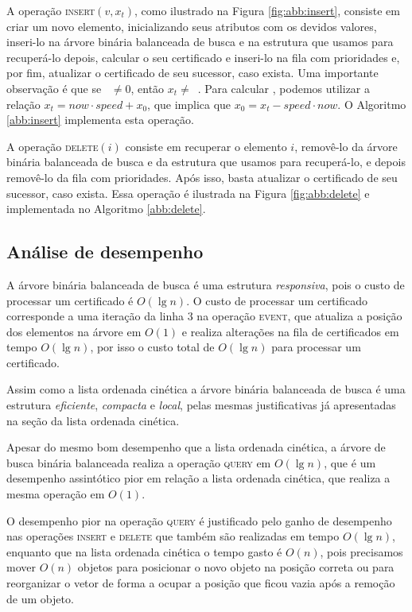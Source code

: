 A operação \textsc{insert}$(v, x_t)$, como ilustrado na Figura
\ref{fig:abb:insert}, consiste em criar um novo elemento,
inicializando seus atributos com os devidos valores, inseri-lo na
árvore binária balanceada de busca e na estrutura que usamos para
recuperá-lo depois, calcular o seu certificado e inseri-lo na fila
com prioridades e, por fim, atualizar o certificado de seu sucessor,
caso exista. Uma importante observação é que se \now~$\neq 0$, então
$x_t \neq$~\initv. Para calcular \initv, podemos utilizar a relação
${x_t = now\cdot speed + x_0}$, que implica que ${x_0 = x_t -
speed\cdot now}$. O Algoritmo \ref{abb:insert} implementa esta
operação.





A operação \textsc{delete}$(i)$ consiste em recuperar o elemento
$i$, removê-lo da árvore binária balanceada de busca e da estrutura
que usamos para recuperá-lo, e depois removê-lo da fila com
prioridades. Após isso, basta atualizar o certificado de seu
sucessor, caso exista. Essa operação é ilustrada na Figura
\ref{fig:abb:delete} e implementada no Algoritmo \ref{abb:delete}.



\FloatBarrier

\subsection{Análise de desempenho}

A árvore binária balanceada de busca é uma estrutura \textit{responsiva}, pois o
custo de processar um certificado é $O(\lg{n})$. O custo de processar um
certificado corresponde a uma iteração da linha $3$ na operação \textsc{event},
que atualiza a posição dos elementos na árvore em $O(1)$ e realiza alterações na
fila de certificados em tempo $O(\lg{n})$, por isso o custo total de $O(\lg{n})$
para processar um certificado.

Assim como a lista ordenada cinética a árvore binária balanceada de busca é uma
estrutura \textit{eficiente}, \textit{compacta} e \textit{local}, pelas mesmas
justificativas já apresentadas na seção da lista ordenada cinética.

Apesar do mesmo bom desempenho que a lista ordenada cinética, a árvore de busca
binária balanceada realiza a operação \textsc{query} em $O(\lg{n})$, que é um
desempenho assintótico pior em relação a lista ordenada cinética, que realiza a
mesma operação em $O(1)$.

O desempenho pior na operação \textsc{query} é justificado pelo ganho de
desempenho nas operações \textsc{insert} e \textsc{delete} que também são
realizadas em tempo $O(\lg{n})$, enquanto que na lista ordenada cinética o tempo
gasto é $O(n)$, pois precisamos mover $O(n)$ objetos para posicionar o novo
objeto na posição correta ou para reorganizar o vetor de forma a ocupar a
posição que ficou vazia após a remoção de um objeto.
